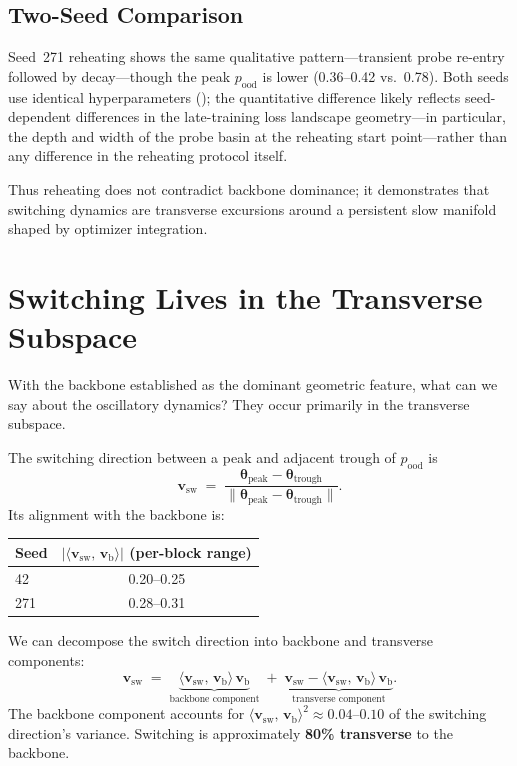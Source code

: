 \documentclass[11pt,a4paper]{article}
\newcommand{\vb}{\mathbf{v}_{\mathrm{b}}}
\newcommand{\vswitch}{\mathbf{v}_{\mathrm{sw}}}
\newcommand{\inner}[2]{\langle #1,\, #2 \rangle}
\newcommand{\norm}[1]{\lVert #1 \rVert}
\newcommand{\abs}[1]{\lvert #1 \rvert}
\begin{document}
\subsection{Two-Seed Comparison}

Seed~271 reheating shows the same qualitative pattern---transient probe
re-entry followed by decay---though the peak $p_{\mathrm{ood}}$ is lower
(0.36--0.42 vs.\ 0.78).  Both seeds use identical hyperparameters
(); the quantitative difference likely reflects
seed-dependent differences in the late-training loss landscape geometry---in
particular, the depth and width of the probe basin at the reheating start
point---rather than any difference in the reheating protocol itself.

Thus reheating does not contradict backbone dominance; it demonstrates that
switching dynamics are transverse excursions around a persistent slow manifold
shaped by optimizer integration.


\section{Switching Lives in the Transverse Subspace}\label{sec:switching}

With the backbone established as the dominant geometric feature, what can we say
about the oscillatory dynamics?  They occur primarily in the transverse
subspace.

The switching direction between a peak and adjacent trough of $p_{\mathrm{ood}}$
is
\begin{equation}\label{eq:switch-dir}
    \vswitch \;=\;
    \frac{\bm{\theta}_{\mathrm{peak}} - \bm{\theta}_{\mathrm{trough}}}
         {\norm{\bm{\theta}_{\mathrm{peak}} - \bm{\theta}_{\mathrm{trough}}}}.
\end{equation}
Its alignment with the backbone is:

\begin{table}[h]
\centering
\begin{tabular}{@{}lc@{}}
\toprule
\textbf{Seed} & $\abs{\inner{\vswitch}{\vb}}$ \textbf{(per-block range)} \\
\midrule
42  & 0.20--0.25 \\
271 & 0.28--0.31 \\
\bottomrule
\end{tabular}
\end{table}

We can decompose the switch direction into backbone and transverse components:
\begin{equation}\label{eq:switch-decomp}
    \vswitch
    \;=\; \underbrace{\inner{\vswitch}{\vb}\,\vb}_{\text{backbone component}}
    \;+\; \underbrace{\vswitch - \inner{\vswitch}{\vb}\,\vb}_{\text{transverse
    component}}.
\end{equation}
The backbone component accounts for $\inner{\vswitch}{\vb}^2 \approx
0.04$--$0.10$ of the switching direction's variance.  Switching is
approximately \textbf{80\% transverse} to the backbone.
\end{document}
